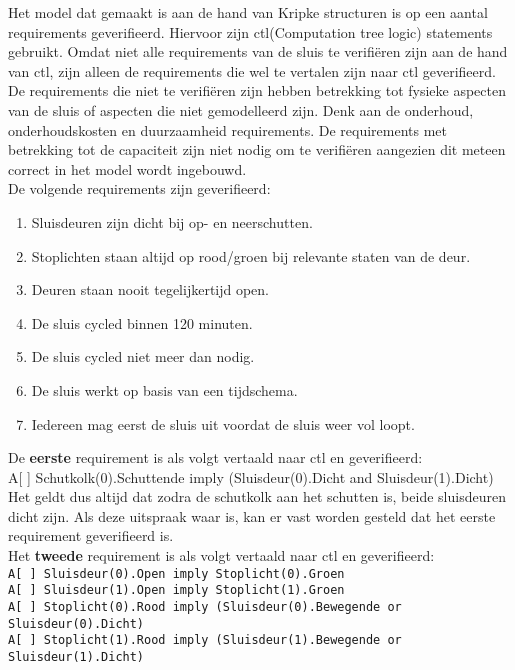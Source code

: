 \documentclass[../verslag.tex]{subfiles}
\begin{document}
Het model dat gemaakt is aan de hand van Kripke structuren is op een aantal requirements geverifieerd.
Hiervoor zijn ctl(Computation tree logic) statements gebruikt.
Omdat niet alle requirements van de sluis te verifiëren zijn aan de hand van ctl, zijn alleen de requirements die wel te vertalen zijn naar ctl geverifieerd.
De requirements die niet te verifiëren zijn hebben betrekking tot fysieke aspecten van de sluis of aspecten die niet gemodelleerd zijn.
Denk aan de onderhoud, onderhoudskosten en duurzaamheid requirements. 
De requirements met betrekking tot de capaciteit zijn niet nodig om te verifiëren aangezien dit meteen correct in het model wordt ingebouwd. \\
De volgende requirements zijn geverifieerd:
\begin{enumerate}
    \item Sluisdeuren zijn dicht bij op- en neerschutten.
    \item Stoplichten staan altijd op rood/groen bij relevante staten van de deur.
    \item Deuren staan nooit tegelijkertijd open.  
    \item De sluis cycled binnen 120 minuten.
    \item De sluis cycled niet meer dan nodig.
    \item De sluis werkt op basis van een tijdschema.
    \item Iedereen mag eerst de sluis uit voordat de sluis weer vol loopt.
\end{enumerate}

De \textbf{eerste} requirement is als volgt vertaald naar ctl en geverifieerd: \\
A[ ] Schutkolk(0).Schuttende imply (Sluisdeur(0).Dicht and Sluisdeur(1).Dicht) \\

Het geldt dus altijd dat zodra de schutkolk aan het schutten is, beide sluisdeuren dicht zijn.
Als deze uitspraak waar is, kan er vast worden gesteld dat het eerste requirement geverifieerd is. \\

Het \textbf{tweede} requirement is als volgt vertaald naar ctl en geverifieerd: \\
\verb|A[ ] Sluisdeur(0).Open imply Stoplicht(0).Groen|  \\
\verb|A[ ] Sluisdeur(1).Open imply Stoplicht(1).Groen| \\
\verb|A[ ] Stoplicht(0).Rood imply (Sluisdeur(0).Bewegende or Sluisdeur(0).Dicht)| \\
\verb|A[ ] Stoplicht(1).Rood imply (Sluisdeur(1).Bewegende or Sluisdeur(1).Dicht)| \\
\end{document}
